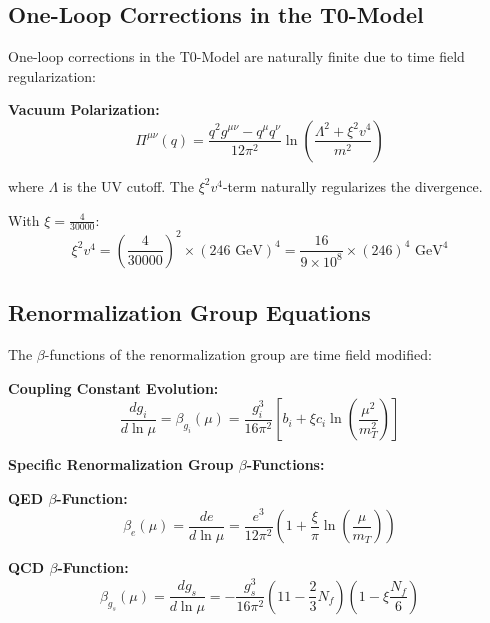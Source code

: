 \documentclass[12pt,a4paper]{report}
\newcommand{\xipar}{\xi}      %
\begin{document}
	\subsection{One-Loop Corrections in the T0-Model}\label{subsec:one_loop_corrections}
	
	One-loop corrections in the T0-Model are naturally finite due to time field regularization:
	
	\textbf{Vacuum Polarization:}
	\begin{equation}\label{eq:vacuum_polarization_t0}
		\Pi^{\mu\nu}(q) = \frac{q^2 g^{\mu\nu} - q^\mu q^\nu}{12\pi^2} \ln\left(\frac{\Lambda^2 + \xipar^2 v^4}{m^2}\right)
	\end{equation}
	
	where $\Lambda$ is the UV cutoff. The $\xipar^2 v^4$-term naturally regularizes the divergence.
	
	With $\xipar = \frac{4}{30000}$:
	\begin{equation}
		\xipar^2 v^4 = \left(\frac{4}{30000}\right)^2 \times (246 \text{ GeV})^4 = \frac{16}{9 \times 10^8} \times (246)^4 \text{ GeV}^4
	\end{equation}
	
	\subsection{Renormalization Group Equations}\label{subsec:renormalization_group_t0}
	
	The $\beta$-functions of the renormalization group are time field modified:
	
	\textbf{Coupling Constant Evolution:}
	\begin{equation}
		\frac{dg_i}{d\ln\mu} = \beta_{g_i}(\mu) = \frac{g_i^3}{16\pi^2} \left[b_i + \xipar c_i \ln\left(\frac{\mu^2}{m_T^2}\right)\right]
	\end{equation}
	
	\textbf{Specific Renormalization Group $\beta$-Functions:}
	
	\textbf{QED $\beta$-Function:}
	\begin{equation}
		\beta_e(\mu) = \frac{de}{d\ln\mu} = \frac{e^3}{12\pi^2} \left(1 + \frac{\xipar}{\pi} \ln\left(\frac{\mu}{m_T}\right)\right)
	\end{equation}
	
	\textbf{QCD $\beta$-Function:}
	\begin{equation}
		\beta_{g_s}(\mu) = \frac{dg_s}{d\ln\mu} = -\frac{g_s^3}{16\pi^2} \left(11 - \frac{2}{3} N_f\right) \left(1 - \xipar \frac{N_f}{6}\right)
	\end{equation}
	
\end{document}
